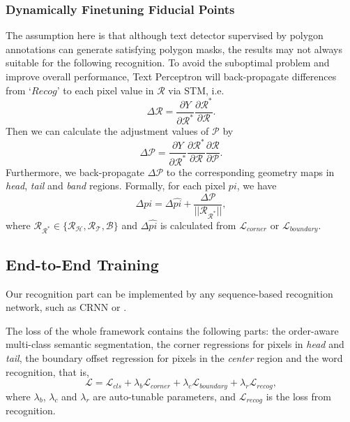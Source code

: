 \documentclass[letterpaper]{article} \usepackage{aaai20}  \usepackage{times}  \usepackage{helvet} \usepackage{courier}  \usepackage[hyphens]{url}  \usepackage{graphicx} \urlstyle{rm} \def\UrlFont{\rm}  \usepackage{graphicx}  \frenchspacing  \setlength{\pdfpagewidth}{8.5in}  \setlength{\pdfpageheight}{11in}  \usepackage{amsmath}
\begin{document}
\subsubsection{Dynamically Finetuning Fiducial Points}
The assumption here is that although text detector supervised by polygon annotations can generate satisfying polygon masks, the results may not always suitable for the following recognition.
To avoid the suboptimal problem and improve overall performance, Text Perceptron will back-propagate differences from `$Recog$' to each pixel value in $\mathcal{R}$ via STM, i.e.
\begin{equation}
\Delta \mathcal{R} = \frac{\partial Y}{\partial \mathcal{R}^*} \frac{\partial \mathcal{R}^*}{\partial \mathcal{R}}.
\end{equation}
Then we can calculate the adjustment values of $\mathcal{P}$ by
\begin{equation}
\Delta \mathcal{P} = \frac{\partial Y}{\partial \mathcal{R}^*} \frac{\partial \mathcal{R}^*}{\partial \mathcal{R}} \frac{\partial \mathcal{R}}{\partial \mathcal{P}}.
\end{equation}
Furthermore, we back-propagate $\Delta \mathcal{P}$ to the corresponding geometry maps in \emph{head}, \emph{tail} and \emph{band} regions.
Formally, for each pixel $pi$, we have
\begin{equation}
\Delta pi = \Delta \hat{pi} + \frac{\Delta \mathcal{P}}{||\mathcal{R}_{\mathcal{R}^*}||},
\end{equation}
where $\mathcal{R}_{\mathcal{R}^*} \in \{\mathcal{R}_{\mathcal{H}}, \mathcal{R}_{\mathcal{T}}, \mathcal{B}\}$ and $\Delta \hat{pi}$ is calculated from $\mathcal{L}_{corner}$ or $\mathcal{L}_{boundary}$.


\subsection{End-to-End Training}
Our recognition part can be implemented by any sequence-based recognition network, such as CRNN \cite{shi2017end} or \cite{cheng2017focus}.

The loss of the whole framework contains the following parts: the order-aware multi-class semantic segmentation, the corner regressions for pixels in \emph{head} and \emph{tail}, the boundary offset regression for pixels in the \emph{center} region and the word recognition, that is,
\begin{equation}
\mathcal{L} = \mathcal{L}_{cls} + \lambda_{b}\mathcal{L}_{corner}+\lambda_{c}\mathcal{L}_{boundary} + \lambda_{r}\mathcal{L}_{recog},
\end{equation}
where $\lambda_{b}$, $\lambda_{c}$ and $\lambda_{r}$ are auto-tunable parameters, and $\mathcal{L}_{recog}$ is the loss from recognition.
\end{document}
